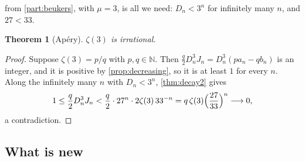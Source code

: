 \documentclass[11pt]{article}
\newcommand{\N}{\mathbb{N}}
\newcommand{\Dn}{D_n}
\theoremstyle{plain}
\newtheorem{theorem}{Theorem}[section]
\theoremstyle{definition}
\theoremstyle{remark}
\begin{document}
 from \cref{part:beukers}, with $\mu=3$, is all we need: $\Dn<3^n$ for infinitely many
$n$, and $27<33$.

\begin{theorem}[Ap\'ery]\label{thm:apery2}
$\zeta(3)$ is irrational.
\end{theorem}

\begin{proof}
Suppose $\zeta(3)=p/q$ with $p,q\in\N$. Then $\frac q2\Dn^3J_n=\Dn^3(pa_n-qb_n)$ is an integer,
and it is positive by \cref{prop:decreasing}, so it is at least $1$ for every $n$. Along the
infinitely many $n$ with $\Dn<3^n$, \cref{thm:decay2} gives
\[
  1\le\frac q2\Dn^3J_n<\frac q2\cdot27^n\cdot2\zeta(3)\,33^{-n}=q\,\zeta(3)\Bigl(\frac{27}{33}\Bigr)^n\longrightarrow0 ,
\]
a contradiction.
\end{proof}

\subsection{What is new}\label{sec:novelty}
\end{document}
